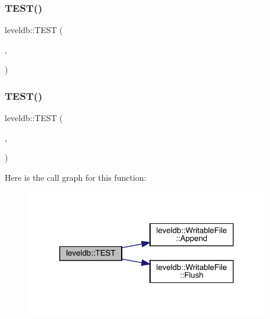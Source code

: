 \subsubsection{\texorpdfstring{TEST()}{TEST()}\hspace{0.1cm}{\footnotesize\ttfamily [22/102]}}
{\footnotesize\ttfamily leveldb\+::\+T\+E\+ST (\begin{DoxyParamCaption}\item[{\mbox{\hyperlink{classleveldb_1_1_recovery_test}{Recovery\+Test}}}]{,  }\item[{Manifest\+Reused}]{ }\end{DoxyParamCaption})}

\mbox{\label{namespaceleveldb_ae2949639deb64fd2bfd7a0051487be20}} 
\subsubsection{\texorpdfstring{TEST()}{TEST()}\hspace{0.1cm}{\footnotesize\ttfamily [23/102]}}
{\footnotesize\ttfamily leveldb\+::\+T\+E\+ST (\begin{DoxyParamCaption}\item[{\mbox{\hyperlink{classleveldb_1_1_recovery_test}{Recovery\+Test}}}]{,  }\item[{Large\+Manifest\+Compacted}]{ }\end{DoxyParamCaption})}

Here is the call graph for this function\+:
\nopagebreak
\begin{figure}[H]
\begin{center}
\leavevmode
\includegraphics[width=301pt]{namespaceleveldb_ae2949639deb64fd2bfd7a0051487be20_cgraph}
\end{center}
\end{figure}
\mbox{\label{namespaceleveldb_a46326658ffc04dd7509c4066082edb1f}} 
